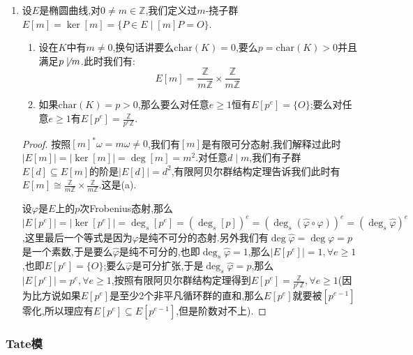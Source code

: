 \begin{enumerate}
\begin{proof}
		最后这个式子是分别关于位置$\varphi$和$\psi$是$\mathbb{Z}$线性的.
	\end{proof}
	\item 设$E$是椭圆曲线,对$0\not=m\in\mathbb{Z}$,我们定义过$m$-挠子群$E[m]=\ker[m]=\{P\in E\mid [m]P=O\}$.
	\begin{enumerate}
		\item 设在$K$中有$m\not=0$,换句话讲要么$\mathrm{char}(K)=0$,要么$p=\mathrm{char}(K)>0$并且满足$p\not\mid m$.此时我们有:
		$$E[m]=\frac{\mathbb{Z}}{m\mathbb{Z}}\times\frac{\mathbb{Z}}{m\mathbb{Z}}$$
		\item 如果$\mathrm{char}(K)=p>0$,那么要么对任意$e\ge1$恒有$E[p^e]=\{O\}$;要么对任意$e\ge1$有$E[p^e]=\frac{\mathbb{Z}}{p^e\mathbb{Z}}$.
	\end{enumerate}
	\begin{proof}
		
		按照$[m]^*\omega=m\omega\not=0$,我们有$[m]$是有限可分态射,我们解释过此时$|E[m]|=|\ker[m]|=\deg[m]=m^2$.对任意$d\mid m$,我们有子群$E[d]\subseteq E[m]$的阶是$|E[d]|=d^2$,有限阿贝尔群结构定理告诉我们此时有$E[m]\cong\frac{\mathbb{Z}}{m\mathbb{Z}}\times\frac{\mathbb{Z}}{m\mathbb{Z}}$.这是(a).
		
		\qquad
		
		设$\varphi$是$E$上的$p$次Frobenius态射,那么$|E[p^e]|=|\ker[p^e]|=\deg_s[p^e]=(\deg_s[p])^e=(\deg_s(\widehat{\varphi}\circ\varphi))^e=(\deg_s\widehat{\varphi})^e$,这里最后一个等式是因为$\varphi$是纯不可分的态射.另外我们有$\deg\widehat{\varphi}=\deg\varphi=p$是一个素数,于是要么$\widehat{\varphi}$是纯不可分的,也即$\deg_s\widehat{\varphi}=1$,那么$|E[p^e]|=1,\forall e\ge1$,也即$E[p^e]=\{O\}$;要么$\widehat{\varphi}$是可分扩张,于是$\deg_s\widehat{\varphi}=p$,那么$|E[p^e]|=p^e,\forall e\ge1$,按照有限阿贝尔群结构定理得到$E[p^e]=\frac{\mathbb{Z}}{p^e\mathbb{Z}},\forall e\ge1$(因为比方说如果$E[p^e]$是至少2个非平凡循环群的直和,那么$E[p^e]$就要被$[p^{e-1}]$零化,所以理应有$E[p^e]\subseteq E[p^{e-1}]$,但是阶数对不上).
	\end{proof}
\end{enumerate}
\subsubsection{Tate模}

